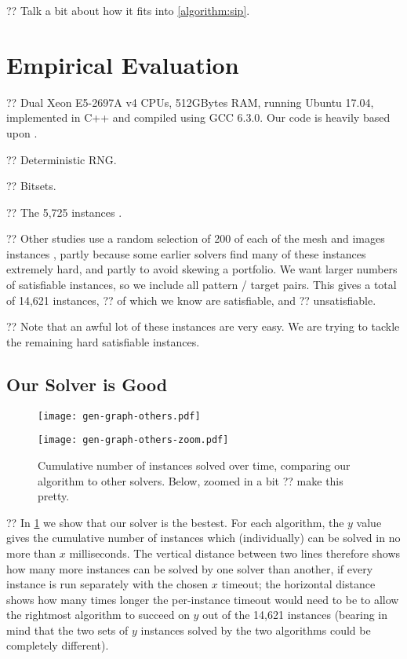 \documentclass{article}
\newcommand{\citet}[1]{\citeauthor{#1} \shortcite{#1}}
\newcommand{\citep}[1]{\cite{#1}}
\begin{document}
?? Talk a bit about how it fits into \cref{algorithm:sip}.

\section{Empirical Evaluation}

?? Dual Xeon E5-2697A v4 CPUs, 512GBytes RAM, running Ubuntu 17.04, implemented in C++ and compiled
using GCC 6.3.0. Our code is heavily based upon \citet{dblp:conf/cp/McCreeshP15}.

?? Deterministic RNG.

?? Bitsets.

?? The 5,725 instances \citep{dblp:conf/lion/KotthoffMS16}.

?? Other studies use a random selection of 200 of each of the mesh and images instances
\citep{DBLP:journals/cviu/DamiandSHJS11}, partly because some earlier solvers find many of these
instances extremely hard, and partly to avoid skewing a portfolio. We want larger numbers of
satisfiable instances, so we include all pattern / target pairs. This gives a total of 14,621
instances, ?? of which we know are satisfiable, and ??  unsatisfiable.

?? Note that an awful lot of these instances are very easy. We are trying to tackle the remaining
hard satisfiable instances.

\subsection{Our Solver is Good}

\begin{figure}[tb]
    \centering
    \texttt{[image: gen-graph-others.pdf]}

    \bigskip

    \centering
    \texttt{[image: gen-graph-others-zoom.pdf]}

    \caption{Cumulative number of instances solved over time, comparing our algorithm to other
    solvers. Below, zoomed in a bit ?? make this pretty.}
    \label{figure:others}
\end{figure}

?? In \cref{figure:others} we show that our solver is the bestest. For each algorithm, the $y$ value
gives the cumulative number of instances which (individually) can be solved in no more than $x$
milliseconds.  The vertical distance between two lines therefore shows how many more instances can
be solved by one solver than another, if every instance is run separately with the chosen $x$
timeout; the horizontal distance shows how many times longer the per-instance timeout would need to
be to allow the rightmost algorithm to succeed on $y$ out of the 14,621 instances (bearing in mind
that the two sets of $y$ instances solved by the two algorithms could be completely different).
\end{document}
